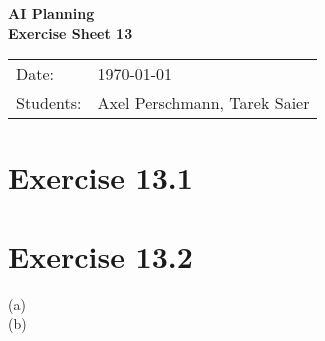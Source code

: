 \documentclass[11pt,a4paper]{article}
\newcommand{\sheetNr}{13}
\begin{document}
\begin{center}
\Huge{\textbf{AI Planning}}\\
\LARGE{\textbf{Exercise Sheet \sheetNr}}
\end{center}
\vspace{2cm}
\begin{tabular}{ll}
Date: & \today\\
Students: & Axel Perschmann, Tarek Saier
\end{tabular}

\section*{Exercise 13.1}

\section*{Exercise 13.2}
(a)\\
(b)

\label{lastpage}
\end{document}
